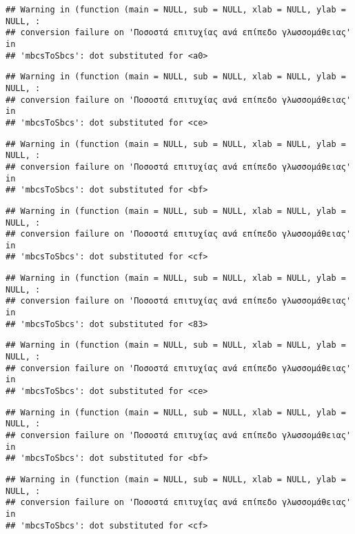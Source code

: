 \documentclass[
]{article}
\begin{document}
\begin{verbatim}
## Warning in (function (main = NULL, sub = NULL, xlab = NULL, ylab = NULL, :
## conversion failure on 'Ποσοστά επιτυχίας ανά επίπεδο γλωσσομάθειας' in
## 'mbcsToSbcs': dot substituted for <a0>
\end{verbatim}

\begin{verbatim}
## Warning in (function (main = NULL, sub = NULL, xlab = NULL, ylab = NULL, :
## conversion failure on 'Ποσοστά επιτυχίας ανά επίπεδο γλωσσομάθειας' in
## 'mbcsToSbcs': dot substituted for <ce>
\end{verbatim}

\begin{verbatim}
## Warning in (function (main = NULL, sub = NULL, xlab = NULL, ylab = NULL, :
## conversion failure on 'Ποσοστά επιτυχίας ανά επίπεδο γλωσσομάθειας' in
## 'mbcsToSbcs': dot substituted for <bf>
\end{verbatim}

\begin{verbatim}
## Warning in (function (main = NULL, sub = NULL, xlab = NULL, ylab = NULL, :
## conversion failure on 'Ποσοστά επιτυχίας ανά επίπεδο γλωσσομάθειας' in
## 'mbcsToSbcs': dot substituted for <cf>
\end{verbatim}

\begin{verbatim}
## Warning in (function (main = NULL, sub = NULL, xlab = NULL, ylab = NULL, :
## conversion failure on 'Ποσοστά επιτυχίας ανά επίπεδο γλωσσομάθειας' in
## 'mbcsToSbcs': dot substituted for <83>
\end{verbatim}

\begin{verbatim}
## Warning in (function (main = NULL, sub = NULL, xlab = NULL, ylab = NULL, :
## conversion failure on 'Ποσοστά επιτυχίας ανά επίπεδο γλωσσομάθειας' in
## 'mbcsToSbcs': dot substituted for <ce>
\end{verbatim}

\begin{verbatim}
## Warning in (function (main = NULL, sub = NULL, xlab = NULL, ylab = NULL, :
## conversion failure on 'Ποσοστά επιτυχίας ανά επίπεδο γλωσσομάθειας' in
## 'mbcsToSbcs': dot substituted for <bf>
\end{verbatim}

\begin{verbatim}
## Warning in (function (main = NULL, sub = NULL, xlab = NULL, ylab = NULL, :
## conversion failure on 'Ποσοστά επιτυχίας ανά επίπεδο γλωσσομάθειας' in
## 'mbcsToSbcs': dot substituted for <cf>
\end{verbatim}
\end{document}
